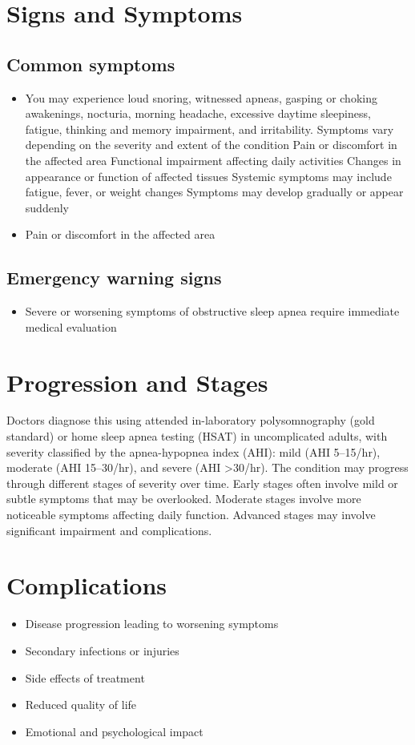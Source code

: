 \section{Signs and Symptoms}

\subsection{Common symptoms}
\begin{itemize}[noitemsep]
  \item You may experience loud snoring, witnessed apneas, gasping or choking awakenings, nocturia, morning headache, excessive daytime sleepiness, fatigue, thinking and memory impairment, and irritability. Symptoms vary depending on the severity and extent of the condition Pain or discomfort in the affected area Functional impairment affecting daily activities Changes in appearance or function of affected tissues Systemic symptoms may include fatigue, fever, or weight changes Symptoms may develop gradually or appear suddenly
  \item Pain or discomfort in the affected area
  \end{itemize}

\subsection{Emergency warning signs}
\begin{itemize}[noitemsep]
  \item Severe or worsening symptoms of obstructive sleep apnea require immediate medical evaluation
\end{itemize}
\section{Progression and Stages}
Doctors diagnose this using attended in-laboratory polysomnography (gold standard) or home sleep apnea testing (HSAT) in uncomplicated adults, with severity classified by the apnea-hypopnea index (AHI): mild (AHI 5--15/hr), moderate (AHI 15--30/hr), and severe (AHI >30/hr). The condition may progress through different stages of severity over time. Early stages often involve mild or subtle symptoms that may be overlooked. Moderate stages involve more noticeable symptoms affecting daily function. Advanced stages may involve significant impairment and complications.
\section{Complications}
\begin{itemize}[noitemsep]
  \item Disease progression leading to worsening symptoms
  \item Secondary infections or injuries
  \item Side effects of treatment
  \item Reduced quality of life
  \item Emotional and psychological impact
\end{itemize}
